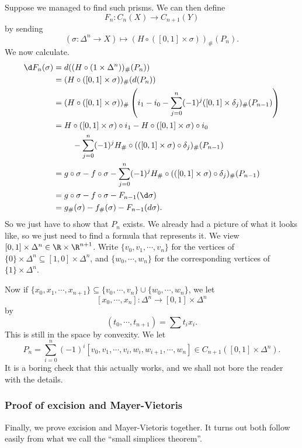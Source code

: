 \documentclass[a4paper]{article}
\theoremstyle{definition}
\begin{document}
Suppose we managed to find such prisms. We can then define
\[
  F_n: C_n(X) \to C_{n + 1}(Y)
\]
by sending
\[
  (\sigma: \Delta^n \to X) \mapsto (H \circ ([0, 1] \times \sigma))_\#(P_n).
\]
We now calculate.
\begin{align*}
  \d F_n(\sigma) ={}& d((H \circ (1 \times \Delta^n))_\#(P_n))\\
  ={}& (H \circ ([0, 1] \times \sigma))_\#(d(P_n))\\
  ={}& (H \circ ([0, 1] \times \sigma))_\# \left(i_1 - i_0 - \sum_{j = 0}^n (-1)^j ([0, 1] \times \delta_j)_\#(P_{n - 1})\right)\\
  ={}& H \circ ([0, 1] \times \sigma) \circ i_1 - H \circ ([0, 1] \times \sigma) \circ i_0 \\
  &\quad- \sum_{j = 0}^n (-1)^j H_\# \circ (([0, 1] \times \sigma) \circ \delta_j)_\# (P_{n - 1})\\
  ={}& g \circ \sigma - f \circ \sigma - \sum_{j = 0}^n (-1)^j H_\# \circ (([0, 1] \times \sigma) \circ \delta_j)_\# (P_{n - 1})\\
  ={}& g \circ \sigma - f \circ \sigma - F_{n - 1}(\d \sigma)\\
  ={}& g_\#(\sigma) - f_\#(\sigma) - F_{n - 1}(d\sigma).
\end{align*}
So we just have to show that $P_n$ exists. We already had a picture of what it looks like, so we just need to find a formula that represents it. We view $[0, 1] \times \Delta^n \in \R \times \R^{n + 1}$. Write $\{v_0, v_1, \cdots, v_n\}$ for the vertices of $\{0\} \times \Delta^n \subseteq [1, 0] \times \Delta^n$, and $\{w_0, \cdots, w_n\}$ for the corresponding vertices of $\{1\} \times \Delta^n$.

Now if $\{x_0, x_1, \cdots, x_{n + 1}\} \subseteq \{v_0, \cdots, v_n\} \cup \{w_0, \cdots, w_n\}$, we let
\[
  [x_0, \cdots, x_n]: \Delta^n \to [0, 1] \times \Delta^n
\]
by
\[
  (t_0, \cdots, t_{n + 1}) = \sum t_i x_i.
\]
This is still in the space by convexity. We let
\[
  P_n = \sum_{i = 0}^n (-1)^i [v_0, v_1 , \cdots, v_i, w_i, w_{i + 1}, \cdots, w_n] \in C_{n + 1}([0, 1] \times \Delta^n).
\]
It is a boring check that this actually works, and we shall not bore the reader with the details.

\subsubsection*{Proof of excision and Mayer-Vietoris}
Finally, we prove excision and Mayer-Vietoris together. It turns out both follow easily from what we call the ``small simplices theorem''.
\end{document}

